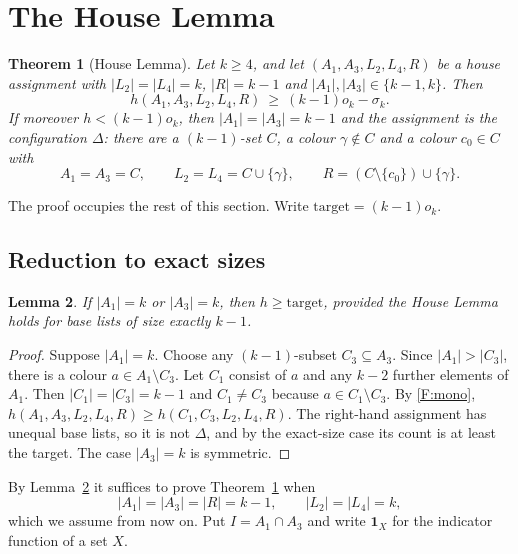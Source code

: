 \documentclass[11pt]{amsart}
\newtheorem{theorem}{Theorem}[section]
\newtheorem{lemma}[theorem]{Lemma}
\theoremstyle{definition}
\theoremstyle{remark}
\newcommand{\1}{\mathbf 1}
\begin{document}
\section{The House Lemma}\label{sec:house}

\begin{theorem}[House Lemma]\label{thm:house}
Let $k\ge4$, and let $(A_1,A_3,L_2,L_4,R)$ be a house assignment with $|L_2|=|L_4|=k$, $|R|=k-1$ and
$|A_1|,|A_3|\in\{k-1,k\}$. Then
\[
h(A_1,A_3,L_2,L_4,R)\ \ge\ (k-1)o_k-\sigma_k .
\]
If moreover $h<(k-1)o_k$, then $|A_1|=|A_3|=k-1$ and the assignment is the configuration $\Delta$:
there are a $(k-1)$-set $C$, a colour $\gamma\notin C$ and a colour $c_0\in C$ with
\[
A_1=A_3=C,\qquad L_2=L_4=C\cup\{\gamma\},\qquad R=(C\setminus\{c_0\})\cup\{\gamma\}.
\]
\end{theorem}

The proof occupies the rest of this section. Write $\mathrm{target}=(k-1)o_k$.

\subsection{Reduction to exact sizes}
\begin{lemma}\label{lem:size}
If $|A_1|=k$ or $|A_3|=k$, then $h\ge\mathrm{target}$, provided the House Lemma holds for base lists
of size exactly $k-1$.
\end{lemma}
\begin{proof}
Suppose $|A_1|=k$. Choose any $(k-1)$-subset $C_3\subseteq A_3$. Since $|A_1|>|C_3|$, there is a colour
$a\in A_1\setminus C_3$. Let $C_1$ consist of $a$ and any $k-2$ further elements of $A_1$. Then
$|C_1|=|C_3|=k-1$ and $C_1\ne C_3$ because $a\in C_1\setminus C_3$. By \ref{F:mono},
$h(A_1,A_3,L_2,L_4,R)\ge h(C_1,C_3,L_2,L_4,R)$. The right-hand assignment has unequal base lists, so it
is not $\Delta$, and by the exact-size case its count is at least the target. The case $|A_3|=k$ is
symmetric.
\end{proof}

By Lemma~\ref{lem:size} it suffices to prove Theorem~\ref{thm:house} when
\begin{equation}\label{eq:sizes}
|A_1|=|A_3|=|R|=k-1,\qquad |L_2|=|L_4|=k,
\end{equation}
which we assume from now on. Put $I=A_1\cap A_3$ and write $\1_X$ for the indicator function of a set $X$.
\end{document}
